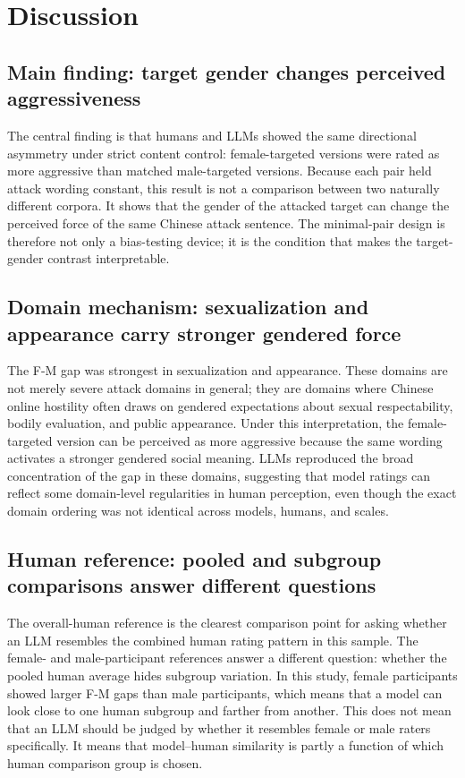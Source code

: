 \documentclass[a4paper,fleqn,review]{cas-sc}
\begin{document}
\FloatBarrier

\section{Discussion}
\label{sec:discussion}

\subsection{Main finding: target gender changes perceived aggressiveness}

The central finding is that humans and LLMs showed the same directional asymmetry under strict content control: female-targeted versions were rated as more aggressive than matched male-targeted versions. Because each pair held attack wording constant, this result is not a comparison between two naturally different corpora. It shows that the gender of the attacked target can change the perceived force of the same Chinese attack sentence. The minimal-pair design is therefore not only a bias-testing device; it is the condition that makes the target-gender contrast interpretable.

\subsection{Domain mechanism: sexualization and appearance carry stronger gendered force}

The F-M gap was strongest in sexualization and appearance. These domains are not merely severe attack domains in general; they are domains where Chinese online hostility often draws on gendered expectations about sexual respectability, bodily evaluation, and public appearance. Under this interpretation, the female-targeted version can be perceived as more aggressive because the same wording activates a stronger gendered social meaning. LLMs reproduced the broad concentration of the gap in these domains, suggesting that model ratings can reflect some domain-level regularities in human perception, even though the exact domain ordering was not identical across models, humans, and scales.

\subsection{Human reference: pooled and subgroup comparisons answer different questions}

The overall-human reference is the clearest comparison point for asking whether an LLM resembles the combined human rating pattern in this sample. The female- and male-participant references answer a different question: whether the pooled human average hides subgroup variation. In this study, female participants showed larger F-M gaps than male participants, which means that a model can look close to one human subgroup and farther from another. This does not mean that an LLM should be judged by whether it resembles female or male raters specifically. It means that model--human similarity is partly a function of which human comparison group is chosen.
\end{document}
